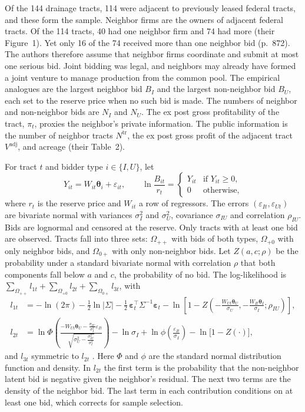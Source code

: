 Of the 144 drainage tracts, 114 were adjacent to previously leased federal tracts, and these form the sample.
Neighbor firms are the owners of adjacent federal tracts. Of the 114 tracts, 40 had one neighbor firm and 74 had
more (their Figure~1). Yet only 16 of the 74 received more than one neighbor bid (p.~872). The authors therefore
assume that neighbor firms coordinate and submit at most one serious bid. Joint bidding was legal, and neighbors
may already have formed a joint venture to manage production from the common pool.
The empirical analogues are the largest neighbor bid $B_I$ and the largest non-neighbor bid $B_U$, each set to the
reserve price when no such bid is made. The numbers of neighbor and non-neighbor bids are $N_I$ and $N_U$. The ex
post gross profitability of the tract, $\pi_t$, proxies the neighbor's private information. The public
information is the number of neighbor tracts $N^{\mathrm{tr}}$, the ex post gross profit of the adjacent tract
$V^{\mathrm{adj}}$, and acreage (their Table~2).

 For tract $t$ and bidder type $i\in\{I,U\}$, let
\begin{equation*}
  Y_{it}=W_{it}\bm\theta_i+\varepsilon_{it},\qquad
  \ln\frac{B_{it}}{r_t}=\begin{cases}Y_{it}&\text{if }Y_{it}\ge0,\\ 0&\text{otherwise,}\end{cases}
\end{equation*}
where $r_t$ is the reserve price and $W_{it}$ a row of regressors. The errors $(\varepsilon_{It},\varepsilon_{Ut})$
are bivariate normal with variances $\sigma_I^2$ and $\sigma_U^2$, covariance $\sigma_{IU}$ and correlation
$\rho_{IU}$. Bids are lognormal and censored at the reserve. Only tracts with at least one bid are observed. Tracts
fall into three sets: $\Omega_{++}$ with bids of both types, $\Omega_{+0}$ with only neighbor bids, and
$\Omega_{0+}$ with only non-neighbor bids. Let $Z(a,c;\rho)$ be the probability under a standard bivariate normal
with correlation $\rho$ that both components fall below $a$ and $c$, the probability of no bid. The log-likelihood
is $\sum_{\Omega_{++}}l_{1t}+\sum_{\Omega_{+0}}l_{2t}+\sum_{\Omega_{0+}}l_{3t}$, with
\begin{align*}
  l_{1t}&=-\ln(2\pi)-\frac12\ln|\Sigma|-\frac12\,\bm\varepsilon_t^\top\Sigma^{-1}\bm\varepsilon_t-\ln\left[1-Z\left(-\frac{W_{Ut}\bm\theta_U}{\sigma_U},-\frac{W_{It}\bm\theta_I}{\sigma_I};\rho_{IU}\right)\right],\\
  l_{2t}&=\ln\Phi\left(\frac{-W_{Ut}\bm\theta_U-\frac{\sigma_{IU}}{\sigma_I^2}\varepsilon_{It}}{\sqrt{\sigma_U^2-\frac{\sigma_{IU}^2}{\sigma_I^2}}}\right)
  -\ln\sigma_I+\ln\phi\left(\frac{\varepsilon_{It}}{\sigma_I}\right)-\ln\bigl[1-Z(\cdot)\bigr],
\end{align*}
and $l_{3t}$ symmetric to $l_{2t}$ \citep[p.~873]{HendricksPorter1988}. Here $\Phi$ and $\phi$ are the standard
normal distribution function and density. In $l_{2t}$ the first term is the probability that the non-neighbor
latent bid is negative given the neighbor's residual. The next two terms are the density of the neighbor bid. The
last term in each contribution conditions on at least one bid, which corrects for sample selection.

